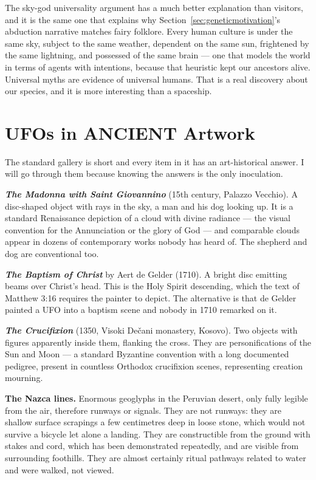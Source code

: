 \begin{funfact}
The sky-god universality argument has a much better explanation than visitors, and it is the
same one that explains why Section~\ref{sec:geneticmotivation}'s abduction narrative matches fairy folklore. Every human
culture is under the same sky, subject to the same weather, dependent on the same sun,
frightened by the same lightning, and possessed of the same brain --- one that models the world
in terms of agents with intentions, because that heuristic kept our ancestors alive. Universal
myths are evidence of universal humans. That is a real discovery about our species, and it is
more interesting than a spaceship.
\end{funfact}

\section{UFOs in ANCIENT Artwork}\label{sec:ufosancientartwork}

The standard gallery is short and every item in it has an art-historical answer. I will go
through them because knowing the answers is the only inoculation.

\textbf{\emph{The Madonna with Saint Giovannino}} (15th century, Palazzo Vecchio). A disc-shaped
object with rays in the sky, a man and his dog looking up. It is a standard Renaissance
depiction of a cloud with divine radiance --- the visual convention for the Annunciation or the
glory of God --- and comparable clouds appear in dozens of contemporary works nobody has heard
of. The shepherd and dog are conventional too.

\textbf{\emph{The Baptism of Christ}} by Aert de Gelder (1710). A bright disc emitting beams
over Christ's head. This is the Holy Spirit descending, which the text of Matthew 3:16 requires
the painter to depict. The alternative is that de Gelder painted a UFO into a baptism scene and
nobody in 1710 remarked on it.

\textbf{\emph{The Crucifixion}} (1350, Visoki De\v{c}ani monastery, Kosovo). Two objects with
figures apparently inside them, flanking the cross. They are personifications of the Sun and
Moon --- a standard Byzantine convention with a long documented pedigree, present in countless
Orthodox crucifixion scenes, representing creation mourning.

\textbf{The Nazca lines.} Enormous geoglyphs in the Peruvian desert, only fully legible from the
air, therefore runways or signals. They are not runways: they are shallow surface scrapings a
few centimetres deep in loose stone, which would not survive a bicycle let alone a landing.
They are constructible from the ground with stakes and cord, which has been demonstrated
repeatedly, and are visible from surrounding foothills. They are almost certainly ritual
pathways related to water and were walked, not viewed.

